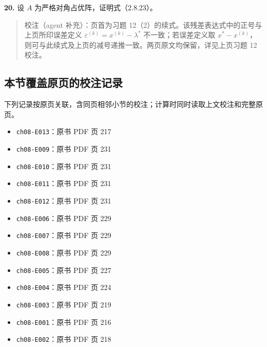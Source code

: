 \documentclass[
  10pt,
  fontset=fandol]{ctexart}
\providecommand{\tightlist}{%
  \setlength{\itemsep}{0pt}\setlength{\parskip}{0pt}}
\begin{document}
\textbf{20.} 设 \(A\) 为严格对角占优阵，证明式（2.8.23）。

\begin{quote}
校注（agent 补充）：页首为习题 12（2）的续式。该残差表达式中的正号与上页所印误差定义 \(\varepsilon^{(k)}=x^{(k)}-\lambda^*\) 不一致；若误差定义取 \(x^*-x^{(k)}\)，则可与此续式及上页的减号递推一致。两页原文均保留，详见上页习题 12 校注。
\end{quote}

\subsection{本节覆盖原页的校注记录}\label{ux672cux8282ux8986ux76d6ux539fux9875ux7684ux6821ux6ce8ux8bb0ux5f55}

下列记录按原页关联，含同页相邻小节的校注；计算时同时读取上文校注和完整原页。

\begin{itemize}
\tightlist
\item
  \texttt{ch08-E013}：原书 PDF 页 217
\item
  \texttt{ch08-E009}：原书 PDF 页 231
\item
  \texttt{ch08-E010}：原书 PDF 页 231
\item
  \texttt{ch08-E011}：原书 PDF 页 231
\item
  \texttt{ch08-E012}：原书 PDF 页 231
\item
  \texttt{ch08-E006}：原书 PDF 页 229
\item
  \texttt{ch08-E007}：原书 PDF 页 229
\item
  \texttt{ch08-E008}：原书 PDF 页 229
\item
  \texttt{ch08-E005}：原书 PDF 页 227
\item
  \texttt{ch08-E004}：原书 PDF 页 224
\item
  \texttt{ch08-E003}：原书 PDF 页 219
\item
  \texttt{ch08-E001}：原书 PDF 页 216
\item
  \texttt{ch08-E002}：原书 PDF 页 218
\end{itemize}
\end{document}
